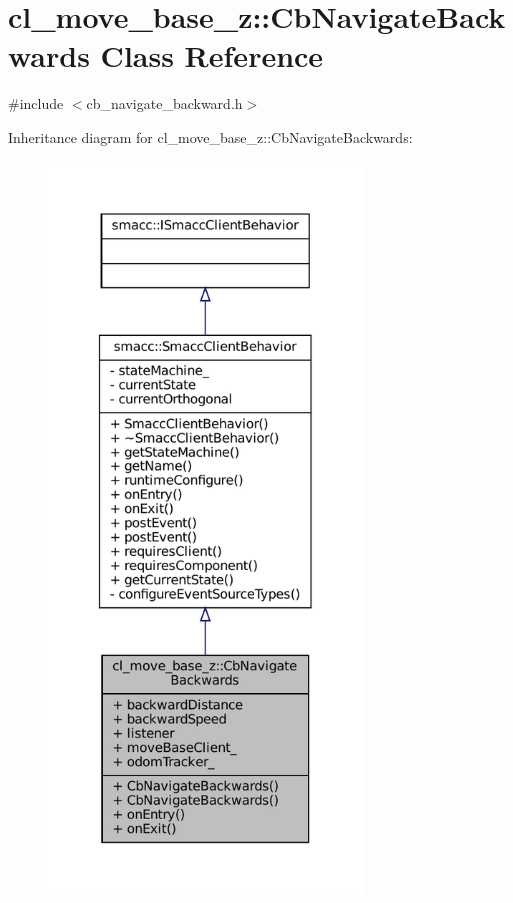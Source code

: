 \hypertarget{classcl__move__base__z_1_1CbNavigateBackwards}{}\section{cl\+\_\+move\+\_\+base\+\_\+z\+:\+:Cb\+Navigate\+Backwards Class Reference}
\label{classcl__move__base__z_1_1CbNavigateBackwards}


{\ttfamily \#include $<$cb\+\_\+navigate\+\_\+backward.\+h$>$}



Inheritance diagram for cl\+\_\+move\+\_\+base\+\_\+z\+:\+:Cb\+Navigate\+Backwards\+:
\nopagebreak
\begin{figure}[H]
\begin{center}
\leavevmode
\includegraphics[height=550pt]{classcl__move__base__z_1_1CbNavigateBackwards__inherit__graph}
\end{center}
\end{figure}


